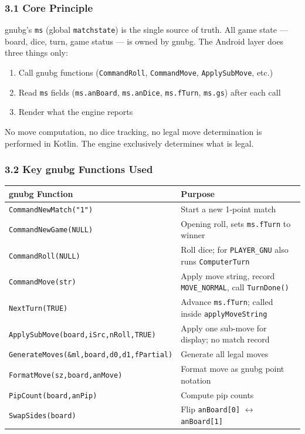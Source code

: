 \documentclass[11pt,a4paper]{article}
\providecommand{\tightlist}{\setlength{\itemsep}{2pt}\setlength{\parskip}{0pt}}
\begin{document}
\subsubsection{3.1 Core Principle}\label{core-principle}

gnubg's \texttt{ms} (global \texttt{matchstate}) is the single source
of truth. All game state --- board, dice, turn, game status --- is owned
by gnubg. The Android layer does three things only:

\begin{enumerate}
\def\labelenumi{\arabic{enumi}.}
\tightlist
\item
  Call gnubg functions (\texttt{CommandRoll}, \texttt{CommandMove},
  \texttt{ApplySubMove}, etc.)
\item
  Read \texttt{ms} fields (\texttt{ms.anBoard}, \texttt{ms.anDice},
  \texttt{ms.fTurn}, \texttt{ms.gs}) after each call
\item
  Render what the engine reports
\end{enumerate}

No move computation, no dice tracking, no legal move determination is
performed in Kotlin. The engine exclusively determines what is legal.

\subsubsection{3.2 Key gnubg Functions Used}\label{key-gnubg-functions}

\begin{longtable}[]{@{}ll@{}}
\toprule\noalign{}
gnubg Function & Purpose \\
\midrule\noalign{}
\endhead
\bottomrule\noalign{}
\endlastfoot
\texttt{CommandNewMatch("1")} & Start a new 1-point match \\
\texttt{CommandNewGame(NULL)} & Opening roll, sets \texttt{ms.fTurn} to winner \\
\texttt{CommandRoll(NULL)} & Roll dice; for \texttt{PLAYER\_GNU} also runs \texttt{ComputerTurn} \\
\texttt{CommandMove(str)} & Apply move string, record \texttt{MOVE\_NORMAL}, call \texttt{TurnDone()} \\
\texttt{NextTurn(TRUE)} & Advance \texttt{ms.fTurn}; called inside \texttt{applyMoveString} \\
\texttt{ApplySubMove(board,iSrc,nRoll,TRUE)} & Apply one sub-move for display; no match record \\
\texttt{GenerateMoves(\&ml,board,d0,d1,fPartial)} & Generate all legal moves \\
\texttt{FormatMove(sz,board,anMove)} & Format move as gnubg point notation \\
\texttt{PipCount(board,anPip)} & Compute pip counts \\
\texttt{SwapSides(board)} & Flip \texttt{anBoard[0]} $\leftrightarrow$ \texttt{anBoard[1]} \\
\end{longtable}
\end{document}
